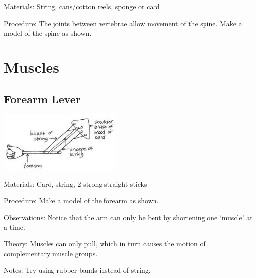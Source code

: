 \begin{multicols}{2}
\begin{description*}
\item[Materials:]{String, cans/cotton reels, sponge or card}
\item[Procedure:]{The joints between vertebrae
allow movement of the spine.
Make a model of the spine as
shown.}
\end{description*}


\section*{Muscles}


\subsection{Forearm Lever}

\begin{center}
\includegraphics[width=0.45\textwidth]{./img/vso/forearm.jpg}
\end{center}

\begin{description*}
\item[Materials:]{Card, string, 2 strong straight sticks}
\item[Procedure:]{Make a model of the forearm as
shown.}
\item[Observations:]{Notice that the arm
can only be bent by shortening
one `muscle' at a time.}
\item[Theory:]{Muscles can only pull, which in turn causes the motion of complementary muscle groups.}
\item[Notes:]{Try using rubber bands
instead of string.}
\end{description*}


\end{multicols}
